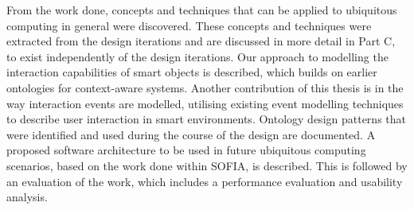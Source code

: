 From the work done, concepts and techniques that can be applied to ubiquitous computing in general were discovered. These concepts and techniques were extracted from the design iterations and are discussed in more detail in Part C, to exist independently of the design iterations. Our approach to modelling the interaction capabilities of smart objects is described, which builds on earlier ontologies for context-aware systems. Another contribution of this thesis is in the way interaction events are modelled, utilising existing event modelling techniques to describe user interaction in smart environments. Ontology design patterns that were identified and used during the course of the design are documented. A proposed software architecture to be used in future ubiquitous computing scenarios, based on the work done within \ac{SOFIA}, is described. This is followed by an evaluation of the work, which includes a performance evaluation and usability analysis. 






